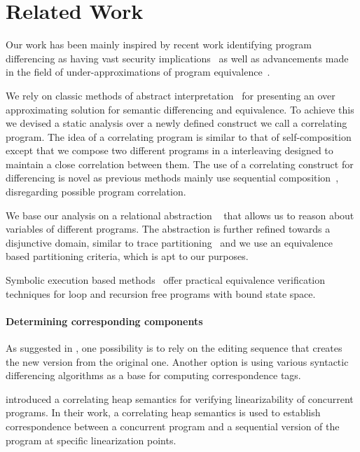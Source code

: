 \section{Related Work} 

Our work has been mainly inspired by recent work identifying program differencing as having vast security implications~\cite{BrumleyPoosankamSongZheng08,SongSunZhang09} as well as advancements made in the field of under-approximations of program equivalence~\cite{GodlinStrichman09, KawaguchiLahiriRebelo10, DwyerElbaumPerson08, EnglerRamos11}.

We rely on classic methods of abstract interpretation~\cite{CousotCousot77} for presenting an over approximating solution for semantic differencing and equivalence. To achieve this we devised a static analysis over a newly defined construct we call a correlating program. The idea of a correlating program is similar to that of
self-composition~\cite{BartheDArgenioRezk04, AikenTerauchi05} except that we compose two different programs in a interleaving designed to maintain a close correlation between them. The use of a correlating construct for differencing is novel as previous methods mainly use sequential composition~\cite{GodlinStrichman09, KawaguchiLahiriRebelo10, DwyerElbaumPerson08, EnglerRamos11}, disregarding possible program correlation.

We base our analysis on a relational abstraction ~\cite{CousotHalbwachs78, Mine07} that allows us to reason about variables of different programs. The abstraction is further refined towards a disjunctive domain, similar to trace partitioning~\cite{MauborgneRival07} and we use an equivalence based partitioning criteria, which is apt to our purposes.

Symbolic execution based methods~\cite{DwyerElbaumPerson08, EnglerRamos11} offer practical equivalence verification techniques for loop and recursion free programs with bound state space.





\paragraph{Determining corresponding components}

As suggested in \cite{Horwitz:PLDI90}, one possibility is to rely on the editing sequence that creates the new version from the original one. Another option is using various syntactic differencing algorithms as a base for computing correspondence tags.


\cite{ARRSY:CAV07} introduced a correlating heap semantics for verifying linearizability of concurrent programs. In their work, a correlating heap semantics is used to establish correspondence between a concurrent program and a sequential version of the program at specific linearization points.  